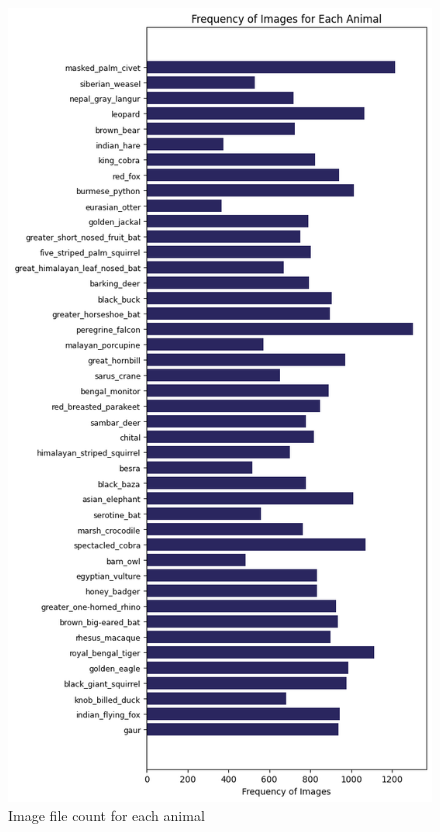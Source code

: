 \documentclass[fleqn, 10pt, twoside]{IOEGC}
\begin{document}
	{

		\begin{figure}
			\centering
			\includegraphics[scale=0.5]{Graphics/naturalist_horizontal.png}
			\caption{Image file count for each animal}
			\label{fig: image_file_count}
		\end{figure}

	}
\end{document}
